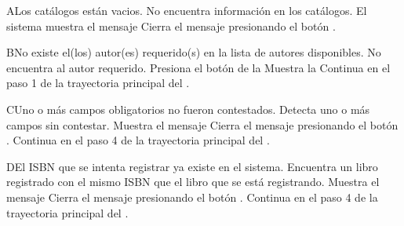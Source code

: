 \begin{UCtrayectoriaA}{A}{Los catálogos están vacios.}
	\UCpaso No encuentra información en los catálogos.
    \UCpaso El sistema muestra el mensaje 
    \UCpaso[\UCactor] Cierra el mensaje presionando el botón .
\end{UCtrayectoriaA}


\begin{UCtrayectoriaA}{B}{No existe el(los) autor(es) requerido(s) en la lista de autores disponibles.}
    \UCpaso[\UCactor] No encuentra al autor requerido.
    \UCpaso[\UCactor] Presiona el botón  de la 
    \UCpaso Muestra la 
    \UCpaso Continua en el paso 1 de la trayectoria principal del .
\end{UCtrayectoriaA}


\begin{UCtrayectoriaA}{C}{Uno o más campos obligatorios no fueron contestados.}
	\UCpaso Detecta uno o más campos sin contestar.
    \UCpaso Muestra el mensaje 
    \UCpaso[\UCactor] Cierra el mensaje presionando el botón .
    \UCpaso Continua en el paso 4 de la trayectoria principal del .
\end{UCtrayectoriaA}


\begin{UCtrayectoriaA}{D}{El ISBN que se intenta registrar ya existe en el sistema.}
	\UCpaso Encuentra un libro registrado con el mismo ISBN que el libro que se está registrando.
    \UCpaso Muestra el mensaje 
    \UCpaso[\UCactor] Cierra el mensaje presionando el botón .
    \UCpaso Continua en el paso 4 de la trayectoria principal del .
\end{UCtrayectoriaA}